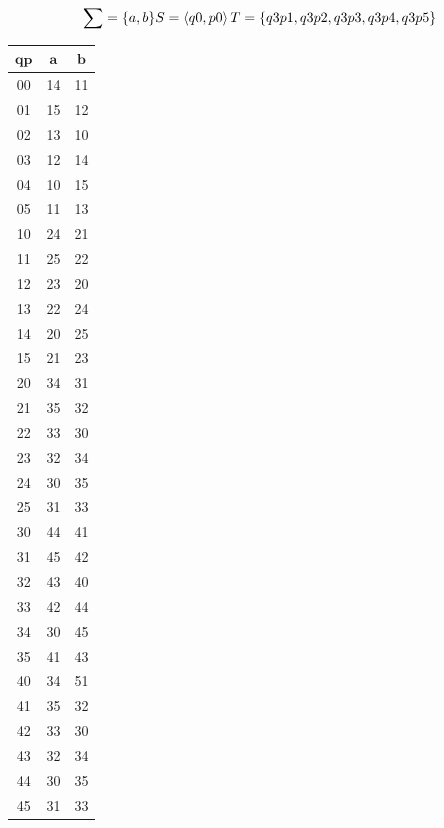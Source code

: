 \documentclass{article}
\begin{document}
\begin{enumerate}
    \begin{center}
    \[
        \sum = \{a, b\} \\
        S = \left\langle q0,p0 \right\rangle \\
        T = \{q3p1, q3p2, q3p3, q3p4, q3p5\}
    \]
    \end{center}
    \begin{center}
        \begin{tabular}{ |c|c|c| } 
        \hline
        $\textbf{qp}$ & $\textbf{a}$ & $\textbf{b}$ \\
        \hline
        00 & 14 & 11\\
        \hline
        01 & 15 & 12\\
        \hline
        02 & 13 & 10\\
        \hline
        03 & 12 & 14\\
        \hline
        04 & 10 & 15\\
        \hline
        05 & 11 & 13\\
        \hline\hline
        10 & 24 & 21\\
        \hline
        11 & 25 & 22\\
        \hline
        12 & 23 & 20\\
        \hline
        13 & 22 & 24\\
        \hline
        14 & 20 & 25\\
        \hline
        15 & 21 & 23\\
        \hline\hline
        20 & 34 & 31\\
        \hline
        21 & 35 & 32\\
        \hline
        22 & 33 & 30\\
        \hline
        23 & 32 & 34\\
        \hline
        24 & 30 & 35\\
        \hline
        25 & 31 & 33\\
        \hline\hline
        30 & 44 & 41\\
        \hline
        31 & 45 & 42\\
        \hline
        32 & 43 & 40\\
        \hline
        33 & 42 & 44\\
        \hline
        34 & 30 & 45\\
        \hline
        35 & 41 & 43\\
        \hline\hline
        40 & 34 & 51\\
        \hline
        41 & 35 & 32\\
        \hline
        42 & 33 & 30\\
        \hline
        43 & 32 & 34\\
        \hline
        44 & 30 & 35\\
        \hline
        45 & 31 & 33\\
        \hline
        \end{tabular}
    \end{center} 
            

\end{enumerate}
\end{document}
